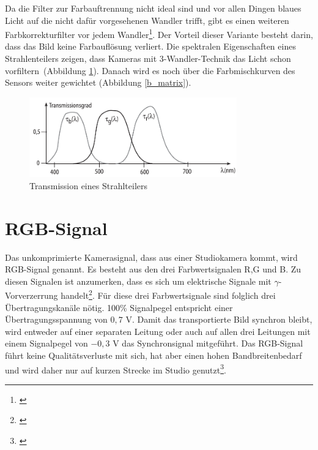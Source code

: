 \noindent Da die Filter zur Farbauftrennung nicht ideal sind und vor allen Dingen blaues Licht auf die nicht dafür vorgesehenen Wandler trifft, gibt es einen weiteren Farbkorrekturfilter vor jedem Wandler\footnote{\cite[379]{schmidt}}. Der Vorteil dieser Variante besteht darin, dass das Bild keine Farbauflösung verliert. Die spektralen Eigenschaften eines Strahlenteilers zeigen, dass Kameras mit 3-Wandler-Technik das Licht schon \glqq vorfiltern\grqq\ (Abbildung \ref{b_twandler}). Danach wird es noch über die Farbmischkurven des Sensors weiter gewichtet (Abbildung \ref{b_matrix}).

\begin{figure}[H]     %
\centering
\includegraphics[width=0.8\textwidth]{bilder/twandler} 
\caption {Transmission eines Strahlteilers\protect\footnotemark}\label{b_twandler}
\end{figure}


\section{RGB-Signal}
\label{sec_rgbsignal}
Das unkomprimierte Kamerasignal, dass aus einer Studiokamera kommt, wird RGB-Signal genannt. Es besteht aus den drei Farbwertsignalen R,G und B. Zu diesen Signalen ist anzumerken, dass es sich um elektrische Signale mit $\gamma$-Vorverzerrung handelt\footnote{\cite[82]{schmidt}}. Für diese drei Farbwertsignale sind folglich drei Übertragungskanäle nötig. 100\% Signalpegel entspricht einer Übertragungsspannung von $0,7$ V. Damit das transportierte Bild synchron bleibt, wird entweder auf einer separaten Leitung oder auch auf allen drei Leitungen mit einem Signalpegel von $-0,3$ V das Synchronsignal mitgeführt. Das RGB-Signal führt keine Qualitätsverluste mit sich, hat aber einen hohen Bandbreitenbedarf und wird daher nur auf kurzen Strecke im Studio genutzt\footnote{\cite[83]{schmidt}}.

